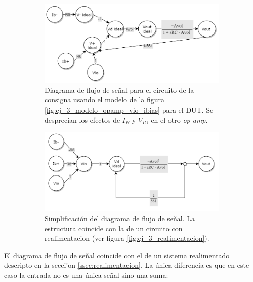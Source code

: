 \documentclass[../../main.tex]{subfiles}
\begin{document}
\begin{figure}[htpb]%
	\centering
	\begin{subfigure}[t]{0.45\textwidth}
		\centering
		\includegraphics[width=\textwidth]{imagenes/signal_flow_consigna.png}
		\caption{Diagrama de flujo de se\~nal para el circuito de la consigna usando el modelo de la figura \ref{fig:ej_3_modelo_opamp_vio_ibias} para el DUT. Se desprecian los efectos de $I_B$ y $V_{IO}$ en el otro \textit{op-amp}.}
		\label{fig:ej_3_signal_flow_consigna_no_simplificado}
	\end{subfigure}%
	\hfill%
	\begin{subfigure}[t]{0.45\textwidth}
		\centering
		\includegraphics[width=\textwidth]{imagenes/signal_flow_consigna_simplificado.png}
		\caption{Simplificaci\'on del diagrama de flujo de se\~nal. La estructura coincide con la de un circuito con realimentacion (ver figura \ref{fig:ej_3_realimentacion}). }
		\label{fig:ej_3_signal_flow_consigna_simplificado}
	\end{subfigure}
	\label{fig:ej_3_signal_flow_consigna}
	\caption{}	
\end{figure}


El diagrama de flujo de se\~nal coincide con el de un sistema realimentado descripto en la secci'on \ref{ssec:realimentacion}. La \'unica diferencia es que en este caso la entrada no es una \'unica se\~nal sino una suma:
\end{document}
